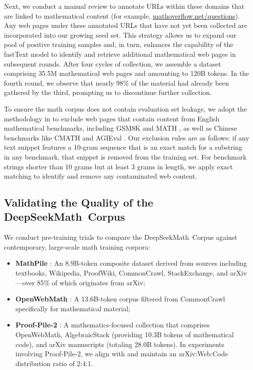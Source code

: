 Next, we conduct a manual review to annotate URLs within these domains that are linked to mathematical content (for example, \url{mathoverflow.net/questions}). Any web pages under these annotated URLs that have not yet been collected are incorporated into our growing seed set. This strategy allows us to expand our pool of positive training samples and, in turn, enhances the capability of the fastText model to identify and retrieve additional mathematical web pages in subsequent rounds. After four cycles of collection, we assemble a dataset comprising 35.5M mathematical web pages and amounting to 120B tokens. In the fourth round, we observe that nearly 98\% of the material had already been gathered by the third, prompting us to discontinue further collection.

To ensure the math corpus does not contain evaluation set leakage, we adopt the methodology in \cite{deepseek-coder} to exclude web pages that contain content from English mathematical benchmarks, including GSM8K \citep{gsm8k} and MATH \citep{MATH}, as well as Chinese benchmarks like CMATH \citep{wei2023cmath} and AGIEval \citep{agieval}. Our exclusion rules are as follows: if any text snippet features a 10-gram sequence that is an exact match for a substring in any benchmark, that snippet is removed from the training set. For benchmark strings shorter than 10 grams but at least 3 grams in length, we apply exact matching to identify and remove any contaminated web content.

\subsection{Validating the Quality of the DeepSeekMath~Corpus}

We conduct pre-training trials to compare the DeepSeekMath~Corpus against contemporary, large-scale math training corpora:

\begin{itemize}[topsep=0pt]
    \item \textbf{MathPile} \citep{mathpile}: An 8.9B-token composite dataset derived from sources including textbooks, Wikipedia, ProofWiki, CommonCrawl, StackExchange, and arXiv—over 85\% of which originates from arXiv;
    \item \textbf{OpenWebMath} \citep{openwebmath}: A 13.6B-token corpus filtered from CommonCrawl specifically for mathematical material;
    \item \textbf{Proof-Pile-2} \citep{llemma}: A mathematics-focused collection that comprises OpenWebMath, AlgebraicStack (providing 10.3B tokens of mathematical code), and arXiv manuscripts (totaling 28.0B tokens). In experiments involving Proof-Pile-2, we align with \cite{llemma} and maintain an arXiv:Web:Code distribution ratio of 2:4:1.
\end{itemize}

